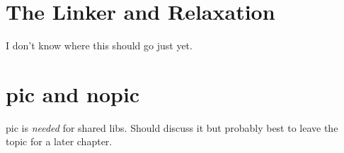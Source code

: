 \section{The Linker and Relaxation}

%
I don't know where this should go just yet.

\section{pic and nopic}

pic is {\em needed} for shared libs.  Should discuss it but probably best 
to leave the topic for a later chapter.
